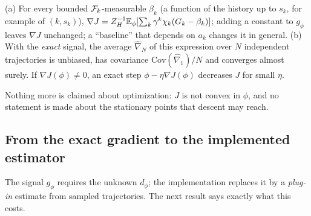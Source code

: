\begin{corollary}\label{cor:m-fpg-mc}
(a) For every bounded $\mathcal{F}_k$-measurable $\beta_k$ (a function of the history up to $s_k$, for example of $(k,s_k)$), $\nabla J=Z_H^{-1}\mathbb{E}_\phi[\sum_k\gamma^k\chi_k(G_k-\beta_k)]$; adding a constant to $g_\phi$ leaves $\nabla J$ unchanged; a ``baseline'' that depends on $a_k$ changes it in general.
(b) With the \emph{exact} signal, the average $\hat\nabla_N$ of this expression over $N$ independent trajectories is unbiased, has covariance $\mathrm{Cov}(\hat\nabla_1)/N$ and converges almost surely. If $\nabla J(\phi)\ne0$, an exact step $\phi-\eta\nabla J(\phi)$ decreases $J$ for small $\eta$.
\end{corollary}
Nothing more is claimed about optimization: $J$ is not convex in $\phi$, and no statement is made about the stationary points that descent may reach.

\subsection{From the exact gradient to the implemented estimator}\label{sec:m-fpg-approx}

The signal $g_\phi$ requires the unknown $d_\phi$; the implementation replaces it by a \emph{plug-in} estimate from sampled trajectories.
The next result says exactly what this costs.

